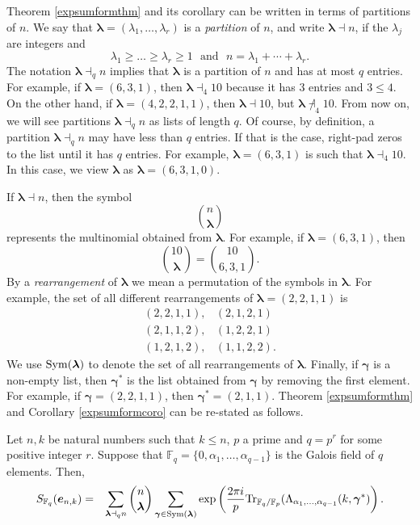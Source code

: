 Theorem \ref{expsumformthm} and its corollary can be written in terms of partitions of $n$.  We say that $\boldsymbol{\lambda}= (\lambda_1,\ldots,\lambda_r)$ is a {\em partition} of $n$, and write $\boldsymbol{\lambda} \dashv n$, if the $\lambda_j$ are integers and
$$\lambda_1\geq \ldots \geq \lambda_r\geq 1 \,\, \text{ and }\,\,n=\lambda_1+\cdots+\lambda_r.$$
The notation $\boldsymbol{\lambda} \dashv_q n$ implies that $\boldsymbol{\lambda}$ is a partition of $n$ and has at most $q$ entries.  For example, if $\boldsymbol{\lambda}=(6,3,1)$, then
$\boldsymbol{\lambda} \dashv_4 10$ because it has 3 entries and $3\leq 4$.  On the other hand, if $\boldsymbol{\lambda} =(4,2,2,1,1)$, then  $\boldsymbol{\lambda} \dashv 10$, but $\boldsymbol{\lambda} \not \dashv_4 10$.  From now on, we will see partitions $\boldsymbol{\lambda} \dashv_q n$ as lists of length $q$.  Of course, by definition, a partition $\boldsymbol{\lambda} \dashv_q n$ may have less than $q$ entries.  If that is the case, right-pad zeros to the list until it has $q$ entries.  For example, $\boldsymbol{\lambda}=(6,3,1)$ is such that $\boldsymbol{\lambda} \dashv_4 10$.  In this case, we view $\boldsymbol{\lambda}$ as $\boldsymbol{\lambda} =(6,3,1,0)$.


If $\boldsymbol{\lambda}  \dashv n$, then the symbol
\begin{equation*}
\binom{n}{\boldsymbol{\lambda}}
\end{equation*}
represents the multinomial obtained from $\boldsymbol{\lambda}$. For example, if $\boldsymbol{\lambda} =(6,3,1)$, then
$$\binom{10}{\boldsymbol{\lambda}}={10 \choose 6,3,1}.$$
By a {\em rearrangement} of  $\boldsymbol{\lambda}$ we mean a permutation of the symbols in $\boldsymbol{\lambda}$.  For example, the set of all different rearrangements of  $\boldsymbol{\lambda} =(2,2,1,1)$ is
\begin{eqnarray*}
(2, 2, 1, 1), & (2, 1, 2, 1)\\
(2, 1, 1, 2), & (1, 2, 2, 1)\\
(1, 2, 1, 2), & (1, 1, 2, 2).
\end{eqnarray*}
We use $\mathrm{Sym}(\boldsymbol{\lambda})$ to denote the set of all rearrangements of $\boldsymbol{\lambda}$.  Finally, if $\boldsymbol{\gamma}$ is a non-empty list, then $\boldsymbol{\gamma}^*$ is the list obtained 
from $\boldsymbol{\gamma}$ by removing the first element.  For example, if $\boldsymbol{\gamma}=(2,2,1,1)$, then $\boldsymbol{\gamma}^*=(2,1,1)$.  Theorem \ref{expsumformthm} 
and Corollary \ref{expsumformcoro} can be re-stated as follows.
\begin{theorem}
\label{thmpart}
Let $n,k$ be natural numbers such that $k\leq n$, $p$ a prime and $q=p^r$ for some positive integer $r$. Suppose that $\mathbb{F}_q=\{0,\alpha_1,\ldots, \alpha_{q-1}\}$ is the Galois field of $q$ elements. 
Then,
\begin{eqnarray*}
S_{\mathbb{F}_q}(\boldsymbol{e}_{n,k})&=&\sum_{\boldsymbol{\lambda}\dashv_q n} \binom{n}{\boldsymbol{\lambda}} \sum_{\boldsymbol{\gamma}\in \mathrm{Sym}(\boldsymbol{\lambda})}
 \exp\left(\frac{2\pi i}{p} \text{Tr}_{\mathbb{F}_q/\mathbb{F}_p}(\Lambda_{\alpha_1,\ldots, \alpha_{q-1}}(k,\boldsymbol{\gamma}^*)\right).
\end{eqnarray*}
\end{theorem}

